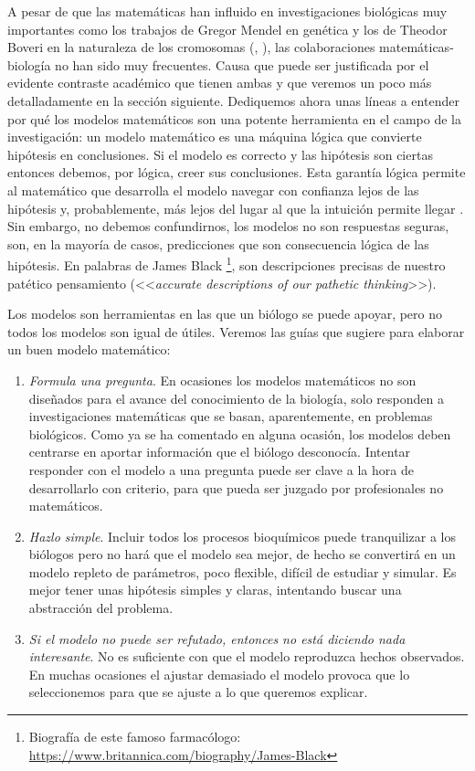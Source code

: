 A pesar de que las matemáticas han influido en investigaciones biológicas muy importantes como los trabajos de Gregor Mendel en genética y los de Theodor Boveri en la naturaleza de los cromosomas (\cite{mathsModInmu}, \cite{esteban2003mendel}), las colaboraciones matemáticas-biología no han sido muy frecuentes. Causa que puede ser justificada por el evidente contraste académico que tienen ambas y que veremos un poco más detalladamente en la sección siguiente. Dediquemos ahora unas líneas a entender por qué los modelos matemáticos son una potente herramienta en el campo de la investigación: un modelo matemático es una máquina lógica que convierte hipótesis en conclusiones. Si el modelo es correcto y las hipótesis son ciertas entonces debemos, por lógica, creer sus conclusiones. Esta garantía lógica permite al matemático que desarrolla el modelo navegar con confianza lejos de las hipótesis y, probablemente, más lejos del lugar al que la intuición permite llegar \citep{Gunawardena2014}. Sin embargo, no debemos confundirnos, los modelos no son respuestas seguras, son, en la mayoría de casos, predicciones que son consecuencia lógica de las hipótesis. En palabras de James Black \footnote{Biografía de este famoso farmacólogo: \url{https://www.britannica.com/biography/James-Black}}, son descripciones precisas de nuestro patético pensamiento (<<\textit{accurate descriptions of our pathetic thinking}>>).

Los modelos son herramientas en las que un biólogo se puede apoyar, pero no todos los modelos son igual de útiles. Veremos las guías que sugiere \cite{Gunawardena2014} para elaborar un buen modelo matemático:

\begin{enumerate}
	\item \textit{Formula una pregunta}. En ocasiones los modelos matemáticos no son diseñados para el avance del conocimiento de la biología, solo responden a investigaciones matemáticas que se basan, aparentemente, en problemas biológicos. Como ya se ha comentado en alguna ocasión, los modelos deben centrarse en aportar información que el biólogo desconocía. Intentar responder con el modelo a una pregunta puede ser clave a la hora de desarrollarlo con criterio, para que pueda ser juzgado por profesionales no matemáticos. 
	
	\item \textit{Hazlo simple}. Incluir todos los procesos bioquímicos puede tranquilizar a los biólogos pero no hará que el modelo sea mejor, de hecho se convertirá en un modelo repleto de parámetros, poco flexible, difícil de estudiar y simular. Es mejor tener unas hipótesis simples y claras, intentando buscar una abstracción del problema.
	
	\item \textit{Si el modelo no puede ser refutado, entonces no está diciendo nada interesante}. No es suficiente con que el modelo reproduzca hechos observados. En muchas ocasiones el ajustar demasiado el modelo provoca que lo seleccionemos para que se ajuste a lo que queremos explicar.  
\end{enumerate}

